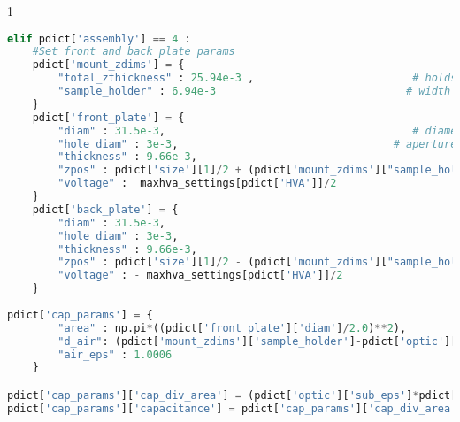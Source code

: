 \begin{spacing}{1}
\begin{lstlisting}[frame=single, language=Python]
elif pdict['assembly'] == 4 :
    #Set front and back plate params
    pdict['mount_zdims'] = {
        "total_zthickness" : 25.94e-3 ,                         # holds both sample and both electrodes [m]
        "sample_holder" : 6.94e-3                              # width of lip that separates sample from electrodes [m] 
    }
    pdict['front_plate'] = {
        "diam" : 31.5e-3,                                       # diameter of plate [m]
        "hole_diam" : 3e-3,                                  # aperture diameter [m]
        "thickness" : 9.66e-3, 
        "zpos" : pdict['size'][1]/2 + (pdict['mount_zdims']["sample_holder"]/2),      # location of plate surface (com) [m]
        "voltage" :  maxhva_settings[pdict['HVA']]/2                                      # Voltage on front plate [V]
    }
    pdict['back_plate'] = {
        "diam" : 31.5e-3,
        "hole_diam" : 3e-3,
        "thickness" : 9.66e-3, 
        "zpos" : pdict['size'][1]/2 - (pdict['mount_zdims']["sample_holder"]/2),
        "voltage" : - maxhva_settings[pdict['HVA']]/2 
    }
    
pdict['cap_params'] = {
        "area" : np.pi*((pdict['front_plate']['diam']/2.0)**2), 
        "d_air": (pdict['mount_zdims']['sample_holder']-pdict['optic']['thickness'])/2.0, 
        "air_eps" : 1.0006
    }

pdict['cap_params']['cap_div_area'] = (pdict['optic']['sub_eps']*pdict['optic']['coat_eps']*pdict['cap_params']['air_eps'])/((2.0*pdict['optic']['sub_eps']*pdict['optic']['coat_eps']*pdict['cap_params']['d_air']) + (pdict['optic']['sub_eps']*pdict['cap_params']['air_eps']*pdict['optic']['coat_thickness']) + (pdict['optic']['coat_eps']*pdict['cap_params']['air_eps']*(pdict ['optic']['sub_thickness'])))
pdict['cap_params']['capacitance'] = pdict['cap_params']['cap_div_area']*pdict['cap_params']['area']


\end{lstlisting}
\end{spacing}
